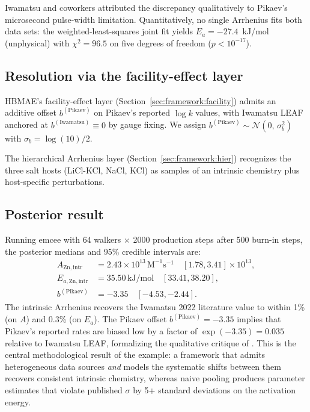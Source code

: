 \documentclass[12pt]{article}
\theoremstyle{plain}
\theoremstyle{definition}
\theoremstyle{remark}
\newcommand{\HBMAE}{HBMAE\xspace}
\begin{document}
Iwamatsu and coworkers attributed the discrepancy qualitatively to Pikaev's
microsecond pulse-width limitation.  Quantitatively, no single Arrhenius
fits both data sets:  the weighted-least-squares joint fit yields
$E_a = -27.4$~kJ/mol (unphysical) with $\chi^2 = 96.5$ on five degrees of
freedom ($p < 10^{-17}$).

\subsection{Resolution via the facility-effect layer}

\HBMAE's facility-effect layer (Section~\ref{sec:framework:facility})
admits an additive offset $b^{(\mathrm{Pikaev})}$ on Pikaev's reported
$\log k$ values, with Iwamatsu LEAF anchored at
$b^{(\mathrm{Iwamatsu})}\equiv 0$ by gauge fixing.  We assign
$b^{(\mathrm{Pikaev})} \sim \mathcal{N}(0,\,\sigma_b^2)$ with
$\sigma_b = \log(10)/2$.

The hierarchical Arrhenius layer (Section~\ref{sec:framework:hier})
recognizes the three salt hosts (LiCl-KCl, NaCl, KCl) as samples of an
intrinsic chemistry plus host-specific perturbations.

\subsection{Posterior result}\label{sec:worked2:result}

Running emcee with 64 walkers $\times$ 2000 production steps after 500
burn-in steps, the posterior medians and 95\% credible intervals are:
%
\begin{align*}
  A_{\mathrm{Zn,intr}} &= 2.43\times 10^{13}\,\mathrm{M}^{-1}\mathrm{s}^{-1}
    \quad [1.78, 3.41]\times 10^{13}, \\
  E_{a,\mathrm{Zn,intr}} &= 35.50\,\mathrm{kJ/mol}\quad [33.41, 38.20], \\
  b^{(\mathrm{Pikaev})} &= -3.35\quad [-4.53, -2.44].
\end{align*}
%
The intrinsic Arrhenius recovers the Iwamatsu 2022 literature value to
within 1\% (on $A$) and 0.3\% (on $E_a$).  The Pikaev offset
$b^{(\mathrm{Pikaev})} = -3.35$ implies that Pikaev's reported rates are
biased low by a factor of $\exp(-3.35) = 0.035$ relative to Iwamatsu LEAF,
formalizing the qualitative critique of \citet{Iwamatsu2022}.  This is the
central methodological result of the example: a framework that admits
heterogeneous data sources \emph{and} models the systematic shifts between
them recovers consistent intrinsic chemistry, whereas naive pooling
produces parameter estimates that violate published $\sigma$ by 5+ standard
deviations on the activation energy.
\end{document}
